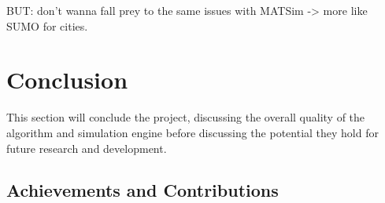 \documentclass[ %
                    author={Alexander Hill},
                supervisor={Dr. Benjamin Sach},
                    degree={MEng},
                     title={MARMOSET},
                  subtitle={Multi-Agent Route Management using Online Simulation for Efficient Transportation},
                      type={research},
                      year={2016} ]{dissertation}
\begin{document}
BUT: don't wanna fall prey to the same issues with MATSim -> more like SUMO for
cities.






\chapter{Conclusion}
\label{chap:conclusion}

This section will conclude the project, discussing the overall quality of the
algorithm and simulation engine before discussing the potential they hold for
future research and development.

\section{Achievements and Contributions}
\end{document}
